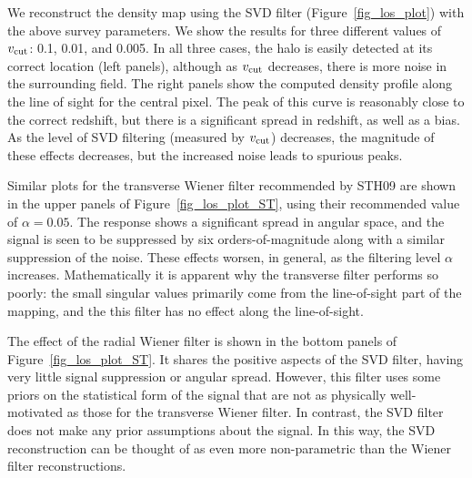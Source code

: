 \documentclass[twocolumn]{emulateapj}
\begin{document}
\begin{figure*}[t]
 \centering
 \caption{
   The effect of Wiener filtering on the same input as 
   Figure~\ref{fig_los_plot}. Here we have used both transverse 
   \textit{(top panels)}
   and radial \textit{(bottom panels)} Wiener filtering, both down-tuned 
   by $\alpha = 0.05$ (the value recommended by STH09).  
   The transverse Wiener filter suppresses the response by several 
   orders of magnitude; a closer view of the line-of-sight peak is shown 
   in the inset plot.  The radial Wiener filter gives similar angular 
   results to the SVD filter, but takes much longer to compute.
   \label{fig_los_plot_ST}} 
\end{figure*}

We reconstruct the density map using the SVD filter 
(Figure~\ref{fig_los_plot}) with the above survey parameters.  
We show the results for three different values of $v_{\rm cut}$: 
0.1, 0.01, and 0.005.  In all three cases, the halo is easily 
detected at its correct location (left panels),
although as $v_{\rm cut}$ decreases, there is more noise in the 
surrounding field.  The right panels show the computed density profile
along the line of sight for the central pixel. 
The peak of this curve is reasonably close to the correct redshift, 
but there is a significant spread in redshift, as well as a bias.
As the level of SVD filtering (measured by $v_{\rm cut}$) decreases, 
the magnitude of these effects decreases, but the increased noise 
leads to spurious peaks. 

Similar plots for the transverse Wiener filter recommended by STH09 are
shown in the upper panels of Figure~\ref{fig_los_plot_ST}, using their 
recommended value of $\alpha = 0.05$. 
The response shows a significant spread in angular space, and 
the signal is seen to be suppressed by six orders-of-magnitude along with
a similar suppression of the noise. 
These effects worsen, 
in general, as the filtering level $\alpha$ increases.
Mathematically it is apparent why the transverse filter performs so poorly:
the small singular values primarily come from the line-of-sight 
part of the mapping, and the this filter has no effect along the line-of-sight.

The effect of the radial Wiener filter is shown in the bottom panels of 
Figure~\ref{fig_los_plot_ST}.
It shares the positive aspects of the SVD filter, having very 
little signal suppression or angular spread.
However, this filter uses some priors on the statistical form of 
the signal that are not as physically well-motivated as those for the 
transverse Wiener filter.  In contrast, the SVD filter does not make 
any prior assumptions about the signal. In this way, the SVD reconstruction
can be thought of as even more non-parametric than the Wiener filter
reconstructions.
\end{document}
